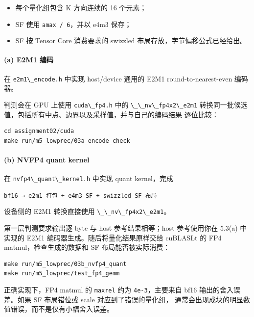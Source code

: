 \documentclass[11pt,a4paper,fontset=none]{ctexart}
\providecommand{\tightlist}{\setlength{\itemsep}{0pt}\setlength{\parskip}{0pt}}
\providecommand{\passthrough}[1]{#1}
\begin{document}
\begin{itemize}
\tightlist
\item
  每个量化组包含 K 方向连续的 16 个元素；
\item
  SF 使用 \passthrough{\lstinline!amax / 6!}，并以 e4m3 保存；
\item
  SF 按 Tensor Core 消费要求的 swizzled 布局存放，字节偏移公式已经给出。
\end{itemize}

\hypertarget{a-e2m1-ux7f16ux7801}{%
\paragraph{(a) E2M1 编码}\label{a-e2m1-ux7f16ux7801}}

在 \passthrough{\lstinline!e2m1\_encode.h!} 中实现 host/device 通用的
E2M1 round-to-nearest-even 编码器。

判测会在 GPU 上使用 \passthrough{\lstinline!cuda\_fp4.h!} 中的
\passthrough{\lstinline!\_\_nv\_fp4x2\_e2m1!}
转换同一批候选值，包括所有中点、边界以及采样值，并与自己的编码结果
逐位比较：

\begin{lstlisting}
cd assignment02/cuda
make run/m5_lowprec/03a_encode_check
\end{lstlisting}

\hypertarget{b-nvfp4-quant-kernel}{%
\paragraph{(b) NVFP4 quant kernel}\label{b-nvfp4-quant-kernel}}

在 \passthrough{\lstinline!nvfp4\_quant\_kernel.h!} 中实现 quant
kernel，完成

\passthrough{\lstinline!bf16 → e2m1 打包 + e4m3 SF + swizzled SF 布局!}

设备侧的 E2M1 转换直接使用
\passthrough{\lstinline!\_\_nv\_fp4x2\_e2m1!}。

第一层判测要求输出逐 byte 与 host 参考结果相等；host 参考使用你在 5.3(a)
中实现的 E2M1 编码器生成。随后将量化结果原样交给 cuBLASLt 的 FP4
matmul，检查生成的数据和 SF 布局能否被实际消费：

\begin{lstlisting}
make run/m5_lowprec/03b_nvfp4_quant
make run/m5_lowprec/test_fp4_gemm
\end{lstlisting}

正确实现下，FP4 matmul 的 \passthrough{\lstinline!maxrel!} 约为
\passthrough{\lstinline!4e-3!}，主要来自 bf16 输出的舍入误差。如果 SF
布局错位或 scale 对应到了错误的量化组，
通常会出现成块的明显数值错误，而不是仅有小幅舍入误差。
\end{document}
